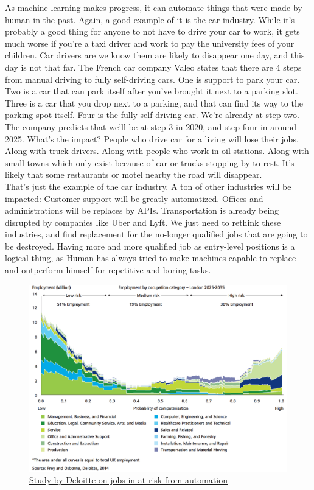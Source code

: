\documentclass[12pt]{article}
\begin{document}
As machine learning makes progress, it can automate things that were made by
human in the past. Again, a good example of it is the car industry. While it's
probably a good thing for anyone to not have to drive your car to work, it gets
much worse if you're a taxi driver and work to pay the university fees of your
children. Car drivers are we know them are likely to disappear one day, and this
day is not that far. The French car company Valeo states that there are 4 steps
from manual driving to fully self-driving cars. One is support to park your car.
Two is a car that can park itself after you've brought it next to a parking
slot. Three is a car that you drop next to a parking, and that can find its way
to the parking spot itself. Four is the fully self-driving car. We're already at
step two. The company predicts that we'll be at step 3 in 2020, and step four in
around 2025. What's the impact? People who drive car for a living will lose
their jobs. Along with truck drivers. Along with people who work in oil
stations. Along with small towns which only exist because of car or trucks
stopping by to rest. It's likely that some restaurants or motel nearby the road
will disappear. \\

That's just the example of the car industry. A ton of other industries will be
impacted: Customer support will be greatly automatized. Offices  and
administrations will be replaces by APIs. Transportation is already being
disrupted by companies like Uber and Lyft. We just need to rethink these
industries, and find replacement for the no-longer qualified jobs that are going
to be destroyed. Having more and more qualified job as entry-level positions is
a  logical thing, as Human has always tried to make machines capable to replace
and outperform himself for repetitive and boring tasks.


\smallskip

\begin{figure}[ht]
    \centering
    \includegraphics[scale=0.6]{jobs}
    \caption{\href{http://www2.deloitte.com/content/dam/Deloitte/uk/Documents/uk-futures/london-futures-agiletown.pdf}
    {Study by Deloitte on jobs in at risk from automation}}
    \label{fig:deloitte}
\end{figure}
\end{document}
